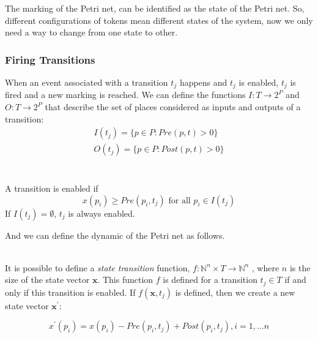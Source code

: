  The marking of the Petri net, can be identified as the
state of the Petri net. So, different configurations of tokens mean different
states of the system, now we only need a way to change from one state to other.
\subsubsection{Firing Transitions}
\label{sec:firingTransitions}
 When an event associated with a transition $t_j$ happens and $t_j$
is enabled, $t_j$ is fired and a new marking is reached.
We can define the functions $I : T \rightarrow 2^P$ and $O : T \rightarrow 2^P$ that
describe the set of places considered as inputs and outputs of a transition: 
\begin{align*}
  I(t_j)= \{p \in P : Pre(p,t)> 0\}\\
  O(t_j)= \{p \in P : Post(p,t)> 0\}\\
\end{align*}
\begin{definition}
  \label{def:enabledTransition}~\\
  A transition is enabled if
  \[ x(p_i)\geq Pre(p_i,t_j) \text{ for all }{p_i \in I(t_j)}\]
  If $I(t_j)=\emptyset$, $t_j$ is always enabled. 
\end{definition}

And we can define the dynamic of the Petri net as follows. 

\begin{definition}
  \label{def:petriNetDynamics}~\\
   It is possible to define a \emph{state transition}
  function, $f : \mathbb{N}^n \times T \rightarrow \mathbb{N}^n$ , where $n$ is
  the size of the state vector $\mathbf{x}$. This function $f$ is defined for
  a transition $t_j \in T$ if and only if this transition is enabled. If
  $f(\mathbf{x},t_j)$ is defined, then we create a new state vector
  $\mathbf{x}^\prime$:

  \[ x^\prime(p_i) = x(p_i) - Pre(p_i,t_j) + Post(p_i,t_j), i=1,\dots n \]
\end{definition}
  
